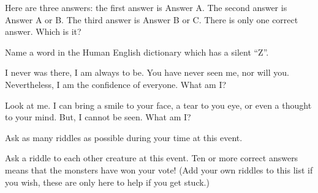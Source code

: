 \documentclass[green]{guildcamp2}
\begin{document}
\begin{enum}
	\item Here are three answers: the first answer is Answer A. The second answer is Answer A or B. The third answer is Answer B or C. There is only one correct answer. Which is it?
	
	\item Name a word in the Human English dictionary which has a silent ``Z''.
	
	\item I never was there, I am always to be. You have never seen me, nor will you. Nevertheless, I am the confidence of everyone. What am I?
	
	\item Look at me. I can bring a smile to your face, a tear to you eye, or even a thought to your mind. But, I cannot be seen. What am I?
\end{enum}

\begin{enum}[Directions]
	\item Ask as many riddles as possible during your time at this event.
	\item Ask a riddle to each other creature at this event. Ten or more correct answers means that the monsters have won your vote! (Add your own riddles to this list if you wish, these are only here to help if you get stuck.)
	\end{enum}
\end{document}
